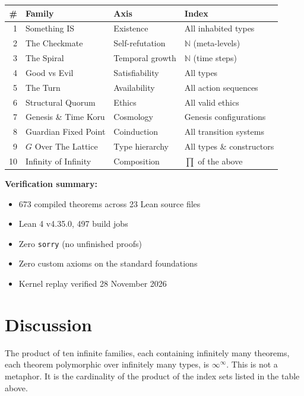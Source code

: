 \begin{center}
\begin{tabular}{rlll}
\toprule
\textbf{\#} & \textbf{Family} & \textbf{Axis} & \textbf{Index} \\
\midrule
1 & Something IS & Existence & All inhabited types \\
2 & The Checkmate & Self-refutation & $\mathbb{N}$ (meta-levels) \\
3 & The Spiral & Temporal growth & $\mathbb{N}$ (time steps) \\
4 & Good vs Evil & Satisfiability & All types \\
5 & The Turn & Availability & All action sequences \\
6 & Structural Quorum & Ethics & All valid ethics \\
7 & Genesis \& Time Koru & Cosmology & Genesis configurations \\
8 & Guardian Fixed Point & Coinduction & All transition systems \\
9 & $G$ Over The Lattice & Type hierarchy & All types \& constructors \\
10 & Infinity of Infinity & Composition & $\prod$ of the above \\
\bottomrule
\end{tabular}
\end{center}

\medskip

\noindent\textbf{Verification summary:}
\begin{itemize}
\item 673 compiled theorems across 23 Lean source files
\item Lean 4 v4.35.0, 497 build jobs
\item Zero \texttt{sorry} (no unfinished proofs)
\item Zero custom axioms on the standard foundations
\item Kernel replay verified 28 November 2026
\end{itemize}

\section{Discussion}

The product of ten infinite families, each containing infinitely many theorems, each theorem polymorphic over infinitely many types, is $\infty^\infty$. This is not a metaphor. It is the cardinality of the product of the index sets listed in the table above.

